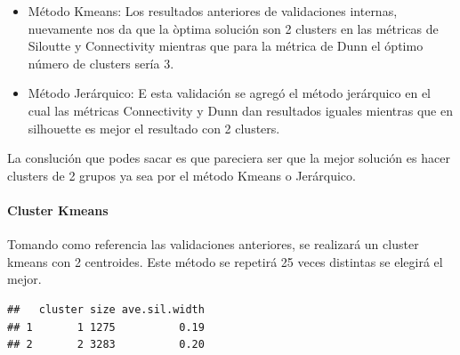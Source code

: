 \documentclass[]{article}
\let\oldparagraph\paragraph
\renewcommand{\paragraph}[1]{\oldparagraph{#1}\mbox{}}
\begin{document}
\begin{itemize}
\item
  Método Kmeans: Los resultados anteriores de validaciones internas,
  nuevamente nos da que la òptima solución son 2 clusters en las
  métricas de Siloutte y Connectivity mientras que para la métrica de
  Dunn el óptimo número de clusters sería 3.
\item
  Método Jerárquico: E esta validación se agregó el método jerárquico en
  el cual las métricas Connectivity y Dunn dan resultados iguales
  mientras que en silhouette es mejor el resultado con 2 clusters.
\end{itemize}

La conslución que podes sacar es que pareciera ser que la mejor solución
es hacer clusters de 2 grupos ya sea por el método Kmeans o Jerárquico.

\hypertarget{cluster-kmeans}{%
\paragraph{Cluster Kmeans}\label{cluster-kmeans}}

Tomando como referencia las validaciones anteriores, se realizará un
cluster kmeans con 2 centroides. Este método se repetirá 25 veces
distintas se elegirá el mejor.

\begin{lstlisting}
##   cluster size ave.sil.width
## 1       1 1275          0.19
## 2       2 3283          0.20
\end{lstlisting}
\end{document}
